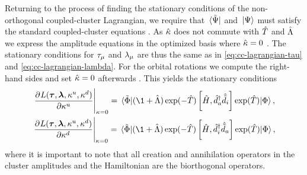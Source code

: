             Returning to the process of finding the stationary conditions of the
            non-orthogonal coupled-cluster Lagrangian, we require that
            $\bra*{\tilde{\Psi}}$ and $\ket*{\Psi}$ must satisfy the standard
            coupled-cluster equations \cite{rolf-nocc}.
            As $\hat{\kappa}$ does not commute with $\hat{T}$ and $\hat{\Lambda}$ we express
            the amplitude equations in the optimized basis where $\hat{\kappa} = 0$
            \cite{ugur-occ, rolf-nocc}.
            The stationary conditions for $\tau_{\mu}$ and
            $\lambda_{\mu}$ are thus the same as in
            \autoref{eq:cc-lagrangian-tau} and
            \autoref{eq:cc-lagrangian-lambda}.
            For the orbital rotations we compute the right-hand sides and set
            $\hat{\kappa} = 0$ afterwards \cite{ugur-occ}.
            This yields the stationary conditions
            \begin{gather}
                \left.
                \dpd{
                    L(\vfg{\clustamp}, \vfg{\clustlamp},
                    \noccten^{u}, \noccten^{d})
                }{
                    {\noccten^{u}}
                }
                \right\rvert_{\noccten = 0}
                = \mel*{\tilde{\slat}}{
                    (\1 + \clustl)
                    \exponential(-\clust)
                    \com{\hamil}{\biccr{a}\bican{i}}
                    \exponential(\clust)
                }{\slat},
                \label{eq:nocc-kappa-up-rhs}
                \\
                \left.
                \dpd{
                    L(\vfg{\clustamp}, \vfg{\clustlamp},
                    \noccten^{u}, \noccten^{d})
                }{
                    {\noccten^{d}}
                }
                \right\rvert_{\noccten = 0}
                = \mel*{\tilde{\slat}}{
                    (\1 + \clustl)
                    \exponential(-\clust)
                    \com{\hamil}{\biccr{i}\bican{a}}
                    \exponential(\clust)
                }{\slat},
                \label{eq:nocc-kappa-down-rhs}
            \end{gather}
            where it is important to note that all creation and annihilation
            operators in the cluster amplitudes and the Hamiltonian are the
            biorthogonal operators.

